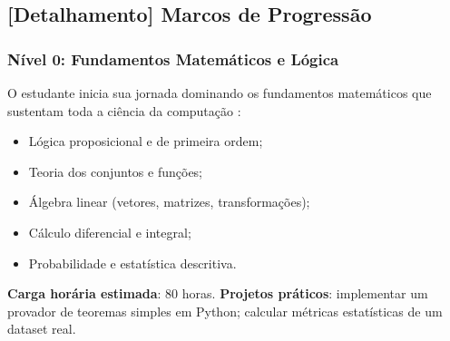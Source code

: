 \begin{table}[htb]
\centering
    \small
\caption{Marcos de progressão do nível zero ao PhD}
\label{tab:marcos-progressao}
\end{table}

\subsection{[Detalhamento] Marcos de Progressão}

\subsubsection{Nível 0: Fundamentos Matemáticos e Lógica}

O estudante inicia sua jornada dominando os fundamentos matemáticos que
sustentam toda a ciência da computação \cite{russell2020inteligencia}:

\begin{itemize}
\item Lógica proposicional e de primeira ordem;
\item Teoria dos conjuntos e funções;
\item Álgebra linear (vetores, matrizes, transformações);
\item Cálculo diferencial e integral;
\item Probabilidade e estatística descritiva.
\end{itemize}

\textbf{Carga horária estimada}: 80 horas.
\textbf{Projetos práticos}: implementar um provador de teoremas simples em
Python; calcular métricas estatísticas de um dataset real.

